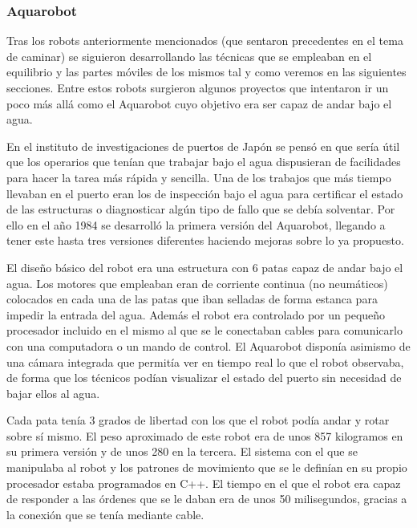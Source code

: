 \subsubsection{Aquarobot}
Tras los robots anteriormente mencionados (que sentaron precedentes en el tema de caminar) se siguieron desarrollando las técnicas que se empleaban en el equilibrio y las partes móviles de los mismos tal y como veremos en las siguientes secciones. Entre estos robots surgieron algunos proyectos que intentaron ir un poco más allá como el Aquarobot cuyo objetivo era ser capaz de andar bajo el agua.

En el instituto de investigaciones de puertos de Japón se pensó en que sería útil que los operarios que tenían que trabajar bajo el agua dispusieran de facilidades para hacer la tarea más rápida y sencilla. Una de los trabajos que más tiempo llevaban en el puerto eran los de inspección bajo el agua para certificar el estado de las estructuras o diagnosticar algún tipo de fallo que se debía solventar. Por ello en el año 1984 se desarrolló la primera versión del Aquarobot, llegando a tener este hasta tres versiones diferentes haciendo mejoras sobre lo ya propuesto.

El diseño básico del robot era una estructura con 6 patas capaz de andar bajo el agua. Los motores que empleaban eran de corriente continua (no neumáticos) colocados en cada una de las patas que iban selladas de forma estanca para impedir la entrada del agua. Además el robot era controlado por un pequeño procesador incluido en el mismo al que se le conectaban cables para comunicarlo con una computadora o un mando de control. El Aquarobot disponía asimismo de una cámara integrada que permitía ver en tiempo real lo que el robot observaba, de forma que los técnicos podían visualizar el estado del puerto sin necesidad de bajar ellos al agua.

Cada pata tenía 3 grados de libertad con los que el robot podía andar y rotar sobre sí mismo. El peso aproximado de este robot era de unos 857 kilogramos en su primera versión y de unos 280 en la tercera. El sistema con el que se manipulaba al robot y los patrones de movimiento que se le definían en su propio procesador estaba programados en C++. El tiempo en el que el robot era capaz de responder a las órdenes que se le daban era de unos 50 milisegundos, gracias a la conexión que se tenía mediante cable.
